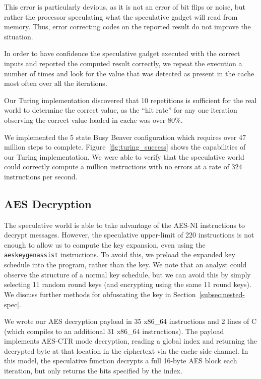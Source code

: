 This error is particularly devious, as it is not an
error of bit flips or noise, but rather the processor speculating what the
speculative gadget will read from memory. Thus, error correcting codes on
the reported result do not improve the situation.



In order to have confidence the speculative gadget executed with the
correct inputs and reported the computed result correctly, 
we repeat the execution a number of times and look for the value that was
detected as present in the cache most often over all the iterations.

Our Turing implementation discovered that 10 repetitions is sufficient for the
real world to determine the correct value, as the ``hit rate'' for any one
iteration observing the correct value loaded in cache was over 80\%.

We implemented the 5 state Busy Beaver configuration which requires over 47
million steps to complete. Figure~\ref{fig:turing_success} shows the
capabilities of our Turing implementation. We were able to verify that the
speculative world could correctly compute a million instructions with no errors
at a rate of 324 instructions per second.



\subsection{AES Decryption}
\label{subsec:impl-aes}
The speculative world is able to take advantage of the AES-NI instructions to
decrypt messages. However, the speculative upper-limit of 220 instructions is not
enough to allow us to compute the key expansion, even using the
\texttt{aeskeygenassist} instructions. To avoid this, we preload the expanded
key schedule into the program, rather than the key. We note that an analyst
could observe the structure of a normal key schedule,
but we can avoid this by simply selecting 11 random round keys (and encrypting
using the same 11 round keys). We discuss further methods for obfuscating
the key in Section~\ref{subsec:nested-spec}.


We wrote our AES decryption payload in 35 x86\_64 instructions and 2 lines of C
(which compiles to an additional 31 x86\_64 instructions). The payload
implements AES-CTR mode decryption, reading a global index and returning the
decrypted byte at that location in the ciphertext via the cache side channel.
In this model, the speculative function decrypts a full 16-byte AES block each
iteration, but only returns the bits specified by the index.

